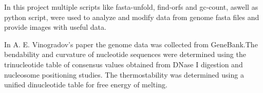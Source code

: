 In this project multiple scripts like fasta-unfold, find-orfs and gc-count, aswell as python script, were used to analyze and modify data from genome fasta files and provide images with useful data.

In A. E. Vinogradov's paper the genome data was collected from GeneBank.The bendability and curvature of nucleotide sequences were
determined using the trinucleotide table of consensus values
obtained from DNase I digestion and nucleosome positioning
studies. The thermostability was determined using a unified dinucleotide table for free energy of melting.

